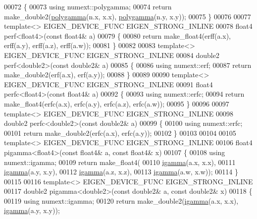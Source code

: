 \begin{DoxyCode}
00072 \{
00073     \textcolor{keyword}{using} numext::polygamma;
00074     \textcolor{keywordflow}{return} make\_double2(\hyperlink{namespace_eigen_ae3b47a13a0699f5dbaa0623c11333dca}{polygamma}(n.x, x.x), \hyperlink{namespace_eigen_ae3b47a13a0699f5dbaa0623c11333dca}{polygamma}(n.y, x.y));
00075 \}
00076 
00077 \textcolor{keyword}{template}<> EIGEN\_DEVICE\_FUNC EIGEN\_STRONG\_INLINE
00078 float4 perf<float4>(\textcolor{keyword}{const} float4& a)
00079 \{
00080   \textcolor{keywordflow}{return} make\_float4(erff(a.x), erff(a.y), erff(a.z), erff(a.w));
00081 \}
00082 
00083 \textcolor{keyword}{template}<> EIGEN\_DEVICE\_FUNC EIGEN\_STRONG\_INLINE
00084 double2 perf<double2>(\textcolor{keyword}{const} double2& a)
00085 \{
00086   \textcolor{keyword}{using} numext::erf;
00087   \textcolor{keywordflow}{return} make\_double2(erf(a.x), erf(a.y));
00088 \}
00089 
00090 \textcolor{keyword}{template}<> EIGEN\_DEVICE\_FUNC EIGEN\_STRONG\_INLINE
00091 float4 perfc<float4>(\textcolor{keyword}{const} float4& a)
00092 \{
00093   \textcolor{keyword}{using} numext::erfc;
00094   \textcolor{keywordflow}{return} make\_float4(erfc(a.x), erfc(a.y), erfc(a.z), erfc(a.w));
00095 \}
00096 
00097 \textcolor{keyword}{template}<> EIGEN\_DEVICE\_FUNC EIGEN\_STRONG\_INLINE
00098 double2 perfc<double2>(\textcolor{keyword}{const} double2& a)
00099 \{
00100   \textcolor{keyword}{using} numext::erfc;
00101   \textcolor{keywordflow}{return} make\_double2(erfc(a.x), erfc(a.y));
00102 \}
00103 
00104 
00105 \textcolor{keyword}{template}<> EIGEN\_DEVICE\_FUNC EIGEN\_STRONG\_INLINE
00106 float4 pigamma<float4>(\textcolor{keyword}{const} float4& a, \textcolor{keyword}{const} float4& x)
00107 \{
00108   \textcolor{keyword}{using} numext::igamma;
00109   \textcolor{keywordflow}{return} make\_float4(
00110       \hyperlink{namespace_eigen_af5aa651137636b1cdbd27de1cfe91148}{igamma}(a.x, x.x),
00111       \hyperlink{namespace_eigen_af5aa651137636b1cdbd27de1cfe91148}{igamma}(a.y, x.y),
00112       \hyperlink{namespace_eigen_af5aa651137636b1cdbd27de1cfe91148}{igamma}(a.z, x.z),
00113       \hyperlink{namespace_eigen_af5aa651137636b1cdbd27de1cfe91148}{igamma}(a.w, x.w));
00114 \}
00115 
00116 \textcolor{keyword}{template}<> EIGEN\_DEVICE\_FUNC EIGEN\_STRONG\_INLINE
00117 double2 pigamma<double2>(\textcolor{keyword}{const} double2& a, \textcolor{keyword}{const} double2& x)
00118 \{
00119   \textcolor{keyword}{using} numext::igamma;
00120   \textcolor{keywordflow}{return} make\_double2(\hyperlink{namespace_eigen_af5aa651137636b1cdbd27de1cfe91148}{igamma}(a.x, x.x), \hyperlink{namespace_eigen_af5aa651137636b1cdbd27de1cfe91148}{igamma}(a.y, x.y));

\end{DoxyCode}
